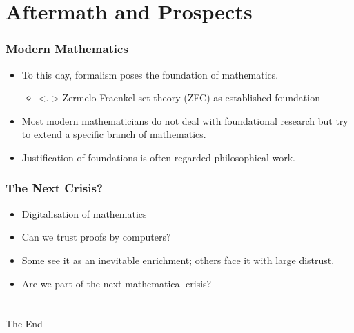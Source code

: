 \documentclass{beamer}
\begin{document}
\section{Aftermath and Prospects}
\begin{frame}
    \frametitle{Modern Mathematics}
    \begin{itemize}[<+->]
	\item To this day, formalism poses the foundation of mathematics.
	\begin{itemize}
		\item<.-> Zermelo-Fraenkel set theory (ZFC) as established foundation
	\end{itemize}
	\item Most modern mathematicians do not deal with foundational research but try to extend a specific branch of mathematics.
	\item Justification of foundations is often regarded philosophical work.
    \end{itemize}
\end{frame}
\begin{frame}
    \frametitle{The Next Crisis?}
    \begin{itemize}[<+->]
	\item Digitalisation of mathematics
	\item Can we trust proofs by computers?
	\item Some see it as an inevitable enrichment; others face it with large distrust.
	\item Are we part of the next mathematical crisis?
    \end{itemize}
\end{frame}
\section*{}
\begin{frame}
    \Huge{\centerline{The End}}
\end{frame}

\newpage


\end{document}
